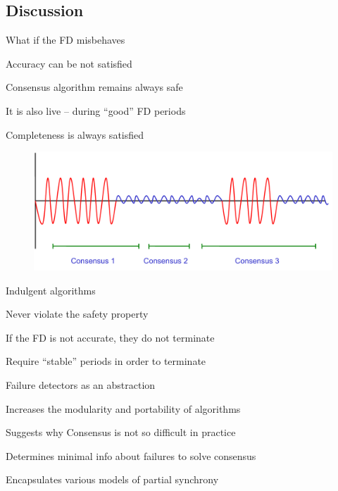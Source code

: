 \subsection{Discussion}

\begin{frame}{What if the FD misbehaves}

\BIL
\item Accuracy can be not satisfied
\BI 
\item Consensus algorithm remains always safe
\item It is also live -- during “good” FD periods
\EI
\item Completeness is always satisfied
\EIL
	
\begin{figure}
	\includegraphics[width=\textwidth]{figs/07/goodbadtimes}
\end{figure}

\end{frame}

\begin{frame}{Indulgent algorithms}

\begin{definition}
\BI
\item Never violate the safety property
\item If the FD is not accurate, they do not terminate
\item Require “stable” periods in order to terminate
\EI
\end{definition}

\bigskip
{}

\bigskip
\begin{Bib}
\BI
\item {}
\EI
\end{Bib}

\end{frame}


\begin{frame}{Failure detectors as an abstraction}


\BIL
\item Increases the modularity and portability of algorithms
\item Suggests why Consensus is not so difficult in practice
\item Determines minimal info about failures to solve consensus
\item Encapsulates various models of partial synchrony
\EIL

\end{frame}


